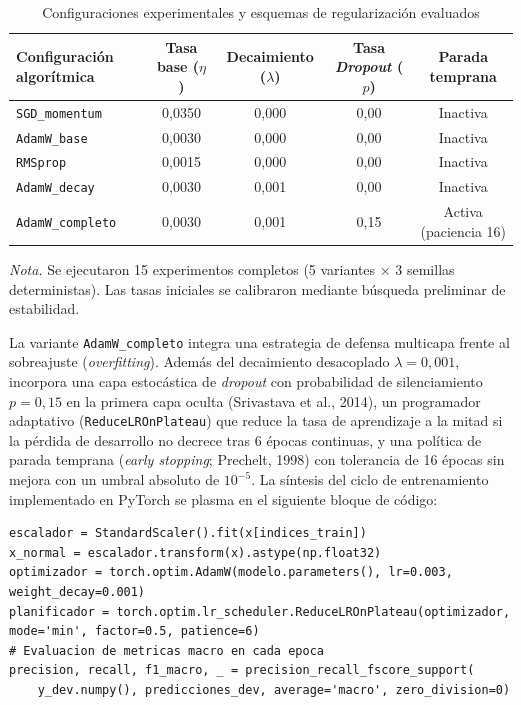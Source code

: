 \documentclass[12pt,letterpaper]{article}
\newcommand{\nota}[1]{\par\noindent\small\textit{Nota.} #1\par\normalsize}
\begin{document}
\begin{table}[H]\caption{Configuraciones experimentales y esquemas de regularización evaluados}\label{tab:config}
\begin{singlespace}\small\centering\begin{tabularx}{\textwidth}{lcccc}\toprule
Configuración algorítmica & Tasa base ($\eta$) & Decaimiento ($\lambda$) & Tasa \textit{Dropout} ($p$) & Parada temprana \\\midrule
\texttt{SGD\_momentum} & 0,0350 & 0,000 & 0,00 & Inactiva \\
\texttt{AdamW\_base} & 0,0030 & 0,000 & 0,00 & Inactiva \\
\texttt{RMSprop} & 0,0015 & 0,000 & 0,00 & Inactiva \\
\texttt{AdamW\_decay} & 0,0030 & 0,001 & 0,00 & Inactiva \\
\texttt{AdamW\_completo} & 0,0030 & 0,001 & 0,15 & Activa (paciencia 16) \\\bottomrule
\end{tabularx}\end{singlespace}\nota{Se ejecutaron 15 experimentos completos (5 variantes $\times$ 3 semillas deterministas). Las tasas iniciales se calibraron mediante búsqueda preliminar de estabilidad.}\end{table}

La variante \texttt{AdamW\_completo} integra una estrategia de defensa multicapa frente al sobreajuste (\textit{overfitting}). Además del decaimiento desacoplado $\lambda = 0{,}001$, incorpora una capa estocástica de \textit{dropout} con probabilidad de silenciamiento $p=0{,}15$ en la primera capa oculta (Srivastava et al., 2014), un programador adaptativo (\texttt{ReduceLROnPlateau}) que reduce la tasa de aprendizaje a la mitad si la pérdida de desarrollo no decrece tras 6 épocas continuas, y una política de parada temprana (\textit{early stopping}; Prechelt, 1998) con tolerancia de 16 épocas sin mejora con un umbral absoluto de $10^{-5}$. La síntesis del ciclo de entrenamiento implementado en PyTorch se plasma en el siguiente bloque de código:

\begin{singlespace}\begin{lstlisting}
escalador = StandardScaler().fit(x[indices_train])
x_normal = escalador.transform(x).astype(np.float32)
optimizador = torch.optim.AdamW(modelo.parameters(), lr=0.003, weight_decay=0.001)
planificador = torch.optim.lr_scheduler.ReduceLROnPlateau(optimizador, mode='min', factor=0.5, patience=6)
# Evaluacion de metricas macro en cada epoca
precision, recall, f1_macro, _ = precision_recall_fscore_support(
    y_dev.numpy(), predicciones_dev, average='macro', zero_division=0)
\end{lstlisting}\end{singlespace}
\end{document}
